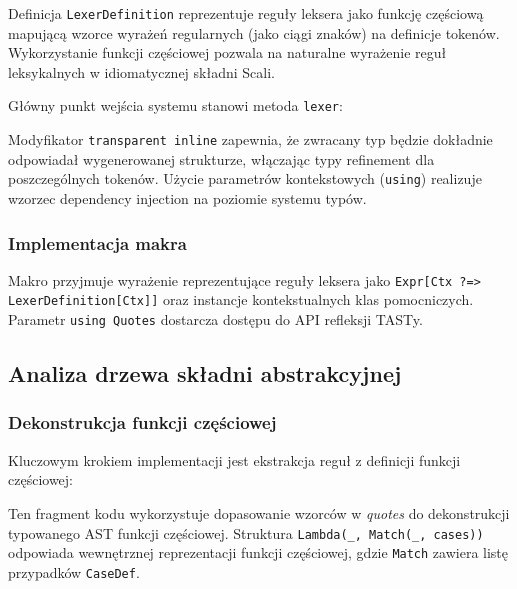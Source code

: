 Definicja \texttt{LexerDefinition} reprezentuje reguły leksera jako funkcję częściową mapującą wzorce wyrażeń regularnych (jako ciągi znaków) na definicje tokenów.
Wykorzystanie funkcji częściowej pozwala na naturalne wyrażenie reguł leksykalnych w idiomatycznej składni Scali.

Główny punkt wejścia systemu stanowi metoda \texttt{lexer}:



Modyfikator \texttt{transparent inline} zapewnia, że zwracany typ będzie dokładnie odpowiadał wygenerowanej strukturze, włączając typy refinement dla poszczególnych tokenów.
Użycie parametrów kontekstowych (\texttt{using}) realizuje wzorzec dependency injection na poziomie systemu typów.

\subsubsection{Implementacja makra}\label{subsubsec:implementacja-makra}

Makro przyjmuje wyrażenie reprezentujące reguły leksera jako \texttt{Expr[Ctx ?=> LexerDefinition[Ctx]]} oraz instancje kontekstualnych klas pomocniczych.
Parametr \texttt{using Quotes} dostarcza dostępu do API refleksji TASTy.

\subsection{Analiza drzewa składni abstrakcyjnej}\label{subsec:analiza-drzewa-skadni-abstrakcyjnej}

\subsubsection{Dekonstrukcja funkcji częściowej}\label{subsubsec:dekonstrukcja-funkcji-czesciowej}

Kluczowym krokiem implementacji jest ekstrakcja reguł z definicji funkcji częściowej:



Ten fragment kodu wykorzystuje dopasowanie wzorców w \textit{quotes} do dekonstrukcji typowanego AST funkcji częściowej.
Struktura \texttt{Lambda(\_, Match(\_, cases))} odpowiada wewnętrznej reprezentacji funkcji częściowej, gdzie \texttt{Match} zawiera listę przypadków \texttt{CaseDef}.

